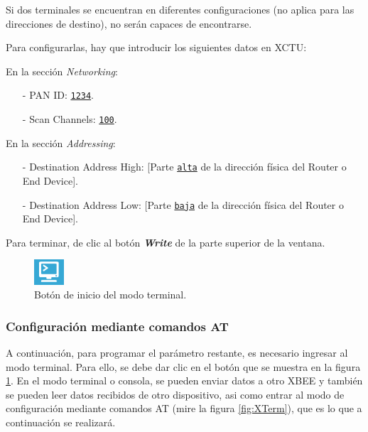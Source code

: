 Si dos terminales se encuentran en diferentes configuraciones (no aplica para las direcciones de destino), no serán capaces de encontrarse.

Para configurarlas, hay que introducir los siguientes datos en XCTU: 

En la sección \textit{Networking}:
\begin{itemize}
	\item[-] PAN ID: \texttt{\underline{1234}}.
	\item[-] Scan Channels: \texttt{\underline{100}}.
\end{itemize}

En la sección \textit{Addressing}:
\begin{itemize}
	\item[-] Destination Address High: [Parte \texttt{\underline{alta}} de la dirección física del 
	Router o End Device].
	\item[-] Destination Address Low: [Parte \texttt{\underline{baja}} de la dirección física del 
	Router o End Device].
\end{itemize}

Para terminar, de clic al botón \textit{\textbf{Write}} de la parte superior de la ventana.

\begin{figure} %
    \centering
    \includegraphics[width=0.10\textwidth]{Figures/XCTU/Console}
    \caption[1]{Botón de inicio del modo terminal.}
    \label{fig:Term}
\end{figure}

\subsubsection{Configuración mediante comandos AT}\label{subsubsec:ConCoor}

A continuación, para programar el parámetro restante, es necesario ingresar al modo terminal. Para ello, se debe dar clic en el botón que se muestra en la figura \ref{fig:Term}. En el modo terminal o consola, se pueden enviar datos a otro XBEE y también se pueden leer datos recibidos de otro dispositivo, asi como entrar al modo de configuración mediante comandos AT (mire la figura \ref{fig:XTerm}), que es lo que a continuación se realizará.  

